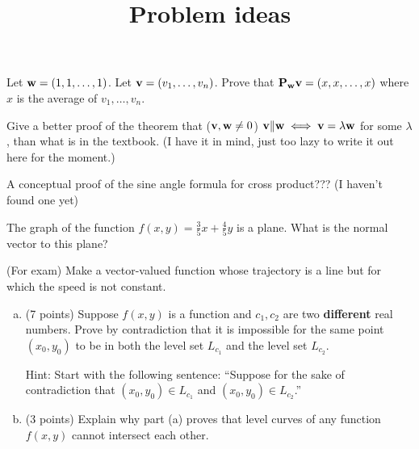\documentclass[11pt,oneside]{amsart}
\title{Problem ideas}
\begin{document}
  \maketitle

  \begin{problem}
    Let $\mathbf w=(1,1,\dots,1)$. Let $\mathbf v=(v_1,\dots,v_n)$. Prove that $\mathbf P_\mathbf w\mathbf v=(x,x,\dots,x)$ where $x$ is the average of $v_1,\dots,v_n$.
  \end{problem}

  \begin{problem}
    Give a better proof of the theorem that ($\mathbf v,\mathbf w\neq 0$) $\mathbf v\|\mathbf w\iff \mathbf v=\lambda\mathbf w$ for some $\lambda$, than what is in the textbook. (I have it in mind, just too lazy to write it out here for the moment.)
  \end{problem}

  \begin{problem}
    A conceptual proof of the sine angle formula for cross product??? (I haven't found one yet)
  \end{problem}

  \begin{problem}
    The graph of the function $f(x,y)=\frac35x+\frac45y$ is a plane. What is the normal vector to this plane?
  \end{problem}

  \begin{problem}
    (For exam) Make a vector-valued function whose trajectory is a line but for which the speed is not constant.
  \end{problem}

  \begin{problem}\leavevmode
    \begin{enumerate}[(a)]
      \item (7 points) Suppose $f(x,y)$ is a function and $c_1,c_2$ are two \textbf{different} real numbers. Prove by contradiction that it is impossible for the same point $(x_0,y_0)$ to be in both the level set $L_{c_1}$ and the level set $L_{c_2}$.

      Hint: Start with the following sentence: ``Suppose for the sake of contradiction that $(x_0,y_0)\in L_{c_1}$ and $(x_0,y_0)\in L_{c_2}$.''
      \vfill
      \vfill
      \item (3 points) Explain why part (a) proves that level curves of any function $f(x,y)$ cannot intersect each other.
      \vfill
    \end{enumerate}
  \end{problem}
\end{document}
